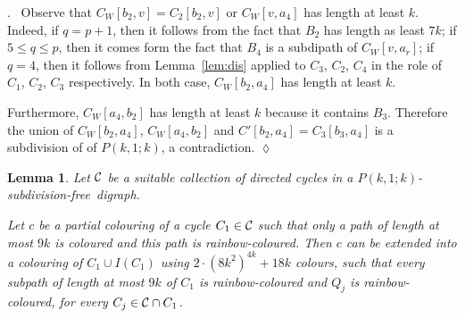 \documentclass[utf8,10pt]{article}
\theoremstyle{plain}
\newtheorem{lemma}[theorem]{Lemma}
\theoremstyle{definition}
\theoremstyle{remark}
\newenvironment{subproof}{\par\noindent {\it Subproof}.\ }{\hfill$\lozenge$\par\vspace{11pt}}
\newcommand{\col}{(8k^2)^{4k}}
\newcommand{\free}{subdivision-free}
\begin{document}
\begin{subproof}
Observe that $C_W[b_2,v]=C_2[b_2,v]$ or $C_W[v, a_4]$ has length at least $k$.
Indeed, if $q=p+1$, then it follows from the fact that $B_2$ has length as least $7k$; if
$5\leq q\leq p$, then it comes form the fact that $B_4$ is a subdipath of $C_W[v, a_r]$; if $q=4$, then it follows from Lemma~\ref{lem:dis}  applied to $C_3$, $C_2$, $C_4$ in the role of $C_1$, $C_2$, $C_3$ respectively.
In both case, $C_W[b_2, a_4]$ has length at least $k$. 

Furthermore, $C_W[a_4,b_2]$ has length at least $k$ because it contains $B_3$. Therefore the union of
$C_W[b_2, a_4]$, $C_W[a_4,b_2]$ and $C'[b_2,a_4]=C_3[b_3,a_4]$ is a subdivision of of $P(k,1;k)$, a contradiction.
\end{subproof}




\begin{lemma}\label{lem:IC}
Let ${\cal C}$ be a suitable collection of directed cycles in a $P(k,1;k)$-\free\ digraph.

Let $c$ be a partial colouring of a cycle $C_1\in {\cal C}$ such that only a path of length at most
$9k$ is coloured and this path is rainbow-coloured. Then $c$ can be extended into
a colouring of $C_1\cup I(C_1)$ using $2\cdot \col + 18k$ colours, such that every subpath of length at most $9k$ of $C_1$ is rainbow-coloured and  $Q_j$ is rainbow-coloured, for every $C_j\in {\cal C}\cap C_1$.\end{lemma}
\end{document}
